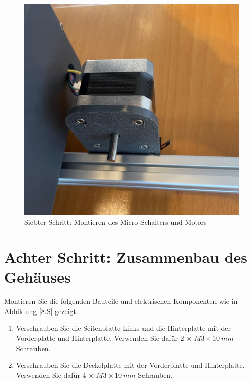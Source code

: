 \begin{figure}[H]
	\begin{center}
		\includegraphics[width=\textwidth]{Images/7Schr.jpg}
		\caption{Siebter Schritt: Montieren des Micro-Schalters und Motors} \label{7.S}
	\end{center}
\end{figure}


\section{Achter Schritt: Zusammenbau des Gehäuses}
Montieren Sie die folgenden Bauteile und elektrischen Komponenten wie in Abbildung \ref{8.S} gezeigt.

\begin{enumerate}
	\item Verschrauben Sie die Seitenplatte Links und die Hinterplatte mit der Vorderplatte und Hinterplatte. Verwenden Sie dafür 2 $\times$ $ M3 \times 10 \ mm $ Schrauben.
	\item Verschrauben Sie die Deckelplatte mit der Vorderplatte und Hinterplatte. Verwenden Sie dafür 4 $\times$ $ M3 \times 10 \ mm $ Schrauben.
\end{enumerate}

